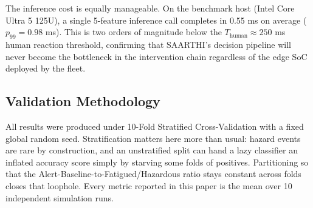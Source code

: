 The inference cost is equally manageable. On the benchmark host (Intel Core
Ultra 5 125U), a single 5-feature inference call completes in 0.55 ms on average
($p_{99} = 0.98$ ms). This is two orders of magnitude below the
$T_{\text{human}} \approx 250$ ms human reaction threshold, confirming that
SAARTHI's decision pipeline will never become the bottleneck in the intervention
chain regardless of the edge SoC deployed by the fleet.

\subsection{Validation Methodology}
All results were produced under 10-Fold Stratified Cross-Validation with a
fixed global random seed. Stratification matters here more than usual: hazard
events are rare by construction, and an unstratified split can hand a lazy
classifier an inflated accuracy score simply by starving some folds of
positives. Partitioning so that the Alert-Baseline-to-Fatigued/Hazardous ratio
stays constant across folds closes that loophole. Every metric reported in this
paper is the mean over 10 independent simulation runs.
